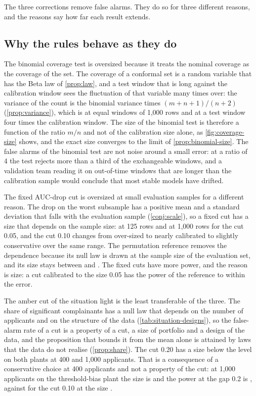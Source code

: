 The three corrections remove false alarms. They do so for three different reasons, and the reasons say how far each result extends.

\subsection{Why the rules behave as they do}

The binomial coverage test is oversized because it treats the nominal coverage as the coverage of the set. The coverage of a conformal set is a random variable that has the Beta law of \cref{prop:law}, and a test window that is long against the calibration window sees the fluctuation of that variable many times over: the variance of the count is the binomial variance times $(m+n+1)/(n+2)$ (\cref{prop:variance}), which is \VarRatioC{} at equal windows of 1,000 rows and \VarRatioD{} at a test window four times the calibration window. The size of the binomial test is therefore a function of the ratio $m/n$ and not of the calibration size alone, as \cref{fig:coverage-size} shows, and the exact size converges to the limit of \cref{prop:binomial-size}. The false alarms of the binomial test are not noise around a small error: at a ratio of 4 the test rejects more than a third of the exchangeable windows, and a validation team reading it on out-of-time windows that are longer than the calibration sample would conclude that most stable models have drifted.

The fixed AUC-drop cut is oversized at small evaluation samples for a different reason. The drop on the worst subsample has a positive mean and a standard deviation that falls with the evaluation sample (\cref{conj:scale}), so a fixed cut has a size that depends on the sample size: \ShRateFixedFiveAZ{} at 125 rows and \ShRateFixedFiveDZ{} at 1,000 rows for the cut 0.05, and the cut 0.10 changes from over-sized to nearly calibrated to slightly conservative over the same range. The permutation reference removes the dependence because its null law is drawn at the sample size of the evaluation set, and its size stays between \ShRatePermAZ{} and \ShRatePermCZ{}. The fixed cuts have more power, and the reason is size: a cut calibrated to the size 0.05 has the power of the reference to within the error.

The amber cut of the situation light is the least transferable of the three. The share of significant complainants has a null law that depends on the number of applicants and on the structure of the data (\cref{tab:situation-designs}), so the false-alarm rate of a cut is a property of a cut, a size of portfolio and a design of the data, and the proposition that bounds it from the mean alone is attained by laws that the data do not realise (\cref{prop:share}). The cut 0.20 has a size below the level on both plants at 400 and 1,000 applicants. That is a consequence of a conservative choice at 400 applicants and not a property of the cut: at 1,000 applicants on the threshold-bias plant the size is \SiRateCutTwentyLargeZ{} and the power at the gap 0.2 is \SiRateCutTwentyLargeB{}, against \SiRateCutTenLargeB{} for the cut 0.10 at the size \SiRateCutTenLargeZ{}.

